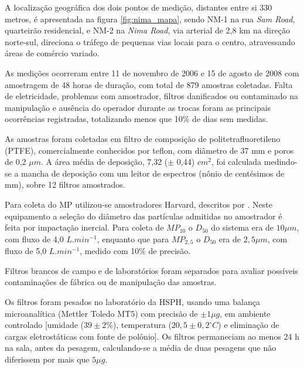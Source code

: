 A localização geográfica dos dois pontos de medição, distantes entre si 330
metros, é apresentada na figura
\ref{fig:nima_mapa}, sendo NM-1 na rua \textit{Sam Road}, quarteirão residencial,
e NM-2 na \textit{Nima Road}, via arterial de 2,8 km na direção norte-sul, 
direciona o tráfego de pequenas vias locais para o centro, atravessando áreas de 
comércio variado. 

As medições ocorreram entre 11 de novembro de 2006 e 15 de agosto de 2008 com 
amostragem de 48 horas de duração, com total de 879 amostras coletadas. 
Falta de eletricidade, problemas com amostrador, 
filtros danificados ou contaminado na manipulação e ausência do 
operador durante as trocas foram as principais ocorrências registradas, 
totalizando menos que 10\% de dias sem medidas. 

As amostras foram coletadas em filtro de composição de politetrafluoretileno
(PTFE), comercialmente conhecidos por teflon, com diâmetro de 37 mm e 
poros de 0,2 $\mu m$. A área média de deposição, 7,32 ($\pm$ 0,44) $cm^2$, 
foi calculada medindo-se a mancha de deposição com um leitor de espectros 
(nônio de centésimos de mm), sobre 12 filtros amostrados.

Para coleta do MP utilizou-se amostradores Harvard, descritos por 
\citet{marple1987}. Neste equipamento a seleção do diâmetro das partículas 
admitidas no amostrador é feita por impactação inercial. 
Para coleta de $MP_{10}$ o $D_{50}$ do sistema era de $10 \mu m$, 
com fluxo de 4,0 $L.min^{-1}$, enquanto que para $MP_{2,5}$ o $D_{50}$ 
era de $2,5 \mu m$, com fluxo de 5,0 $L.min^{-1}$, medido com 10\% de precisão. 

Filtros brancos de campo e de laboratórios foram separados para avaliar 
possíveis contaminações de fábrica ou de manipulação das amostras. 

Os filtros foram pesados no laboratório da HSPH, usando uma balança
microanalítica (Mettler Toledo MT5) com precisão de $\pm 1 \mu g$, 
em ambiente controlado [umidade ($39 \pm 2 \%$), 
temperatura ($20,5 \pm 0,2 ^{\circ} C$) e eliminação de cargas eletrostáticas 
com fonte de polônio]. Os filtros permaneciam ao menos 24 h na sala, 
antes da pesagem, calculando-se a média de duas pesagens que não diferissem 
por mais que $5 \mu g$.

